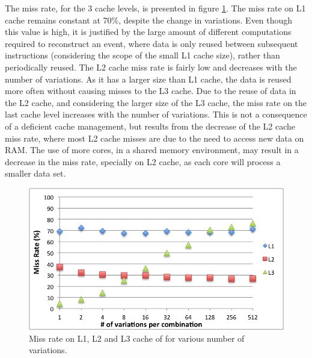 The miss rate, for the 3 cache levels, is presented in figure \ref{fig:MissRate}. The miss rate on L1 cache remains constant at 70\%, despite the change in variations. Even though this value is high, it is justified by the large amount of different computations required to reconstruct an event, where data is only reused between subsequent instructions (considering the scope of the small L1 cache size), rather than periodically reused. The L2 cache miss rate is fairly low and decreases with the number of variations. As it has a larger size than L1 cache, the data is reused more often without causing misses to the L3 cache. Due to the reuse of data in the L2 cache, and considering the larger size of the L3 cache, the miss rate on the last cache level increases with the number of variations. This is not a consequence of a deficient cache management, but results from the decrease of the L2 cache miss rate, where most L2 cache misses are due to the need to access new data on RAM. The use of more cores, in a shared memory environment, may result in a decrease in the miss rate, specially on L2 cache, as each core will process a smaller data set.

\begin{figure}[!htp]
	\begin{center}
		\includegraphics[scale=0.8]{../../common/graphs/miss_rate.png}  
		\caption{Miss rate on L1, L2 and L3 cache of \ttDilepKinFit for various number of variations.}
		\label{fig:MissRate}
	\end{center}
\end{figure}

